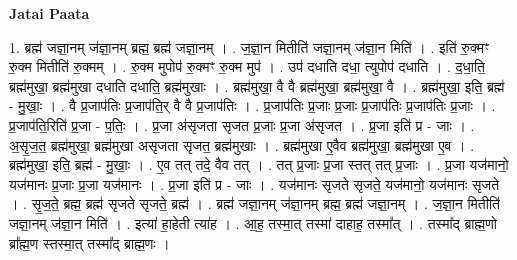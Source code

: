 \documentclass[17pt]{extarticle}
\begin{document}
\textbf{Jatai Paata} \newline

1. ब्रह्म॑ जज्ञा॒नम् ज॑ज्ञा॒नम् ब्रह्म॒ ब्रह्म॑ जज्ञा॒नम् । . ज॒ज्ञा॒न मितीति॑ जज्ञा॒नम् ज॑ज्ञा॒न मिति॑ । . इति॑ रु॒क्मꣳ रु॒क्म मितीति॑ रु॒क्मम् । . रु॒क्म मुपोप॑ रु॒क्मꣳ रु॒क्म मुप॑ । . उप॑ दधाति दधा॒ त्युपोप॑ दधाति । . द॒धा॒ति॒ ब्रह्म॑मुखा॒ ब्रह्म॑मुखा दधाति दधाति॒ ब्रह्म॑मुखाः । . ब्रह्म॑मुखा॒ वै वै ब्रह्म॑मुखा॒ ब्रह्म॑मुखा॒ वै । . ब्रह्म॑मुखा॒ इति॒ ब्रह्म॑ - मु॒खाः॒ । . वै प्र॒जाप॑तिः प्र॒जाप॑ति॒र् वै वै प्र॒जाप॑तिः । . प्र॒जाप॑तिः प्र॒जाः प्र॒जाः प्र॒जाप॑तिः प्र॒जाप॑तिः प्र॒जाः । . प्र॒जाप॑ति॒रिति॑ प्र॒जा - प॒तिः॒ । . प्र॒जा अ॑सृजता सृजत प्र॒जाः प्र॒जा अ॑सृजत । . प्र॒जा इति॑ प्र - जाः । . अ॒सृ॒ज॒त॒ ब्रह्म॑मुखा॒ ब्रह्म॑मुखा असृजता सृजत॒ ब्रह्म॑मुखाः । . ब्रह्म॑मुखा ए॒वैव ब्रह्म॑मुखा॒ ब्रह्म॑मुखा ए॒व । . ब्रह्म॑मुखा॒ इति॒ ब्रह्म॑ - मु॒खाः॒ । . ए॒व तत् तदे॒ वैव तत् । . तत् प्र॒जाः प्र॒जा स्तत् तत् प्र॒जाः । . प्र॒जा यज॑मानो॒ यज॑मानः प्र॒जाः प्र॒जा यज॑मानः । . प्र॒जा इति॑ प्र - जाः । . यज॑मानः सृजते सृजते॒ यज॑मानो॒ यज॑मानः सृजते । . सृ॒ज॒ते॒ ब्रह्म॒ ब्रह्म॑ सृजते सृजते॒ ब्रह्म॑ । . ब्रह्म॑ जज्ञा॒नम् ज॑ज्ञा॒नम् ब्रह्म॒ ब्रह्म॑ जज्ञा॒नम् । . ज॒ज्ञा॒न मितीति॑ जज्ञा॒नम् ज॑ज्ञा॒न मिति॑ । . इत्या॑ हा॒हेती त्या॑ह । . आ॒ह॒ तस्मा॒त् तस्मा॑ दाहाह॒ तस्मा᳚त् । . तस्मा᳚द् ब्राह्म॒णो ब्रा᳚ह्म॒ण स्तस्मा॒त् तस्मा᳚द् ब्राह्म॒णः । \newline
\end{document}
